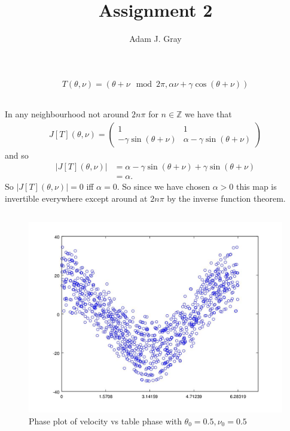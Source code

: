 \documentclass{unswmaths}
\begin{document}
\author{Adam J. Gray}
\title{Assignment 2}
\subject{Ergodic Theory}

\unswtitle

\section{}
\subsection{}
\begin{align*}
    T(\theta, \nu) = (\theta + \nu \mod 2\pi, \alpha\nu + \gamma \cos(\theta + \nu))
\end{align*}
\subsection{}
In any neighbourhood not around $ 2n\pi $ for $ n \in \mathbb{Z} $ we have that
\begin{align*}
    J[T](\theta, \nu) = \left( 
    \begin{array}{cc}
        1   & 1 \\
        -\gamma \sin(\theta + \nu) & \alpha - \gamma\sin(\theta + \nu)
    \end{array}
    \right)
\end{align*}
and so
\begin{align*}
|J[T](\theta, \nu)| &= \alpha - \gamma\sin(\theta + \nu) + \gamma\sin(\theta + \nu) \\
    &= \alpha.
\end{align*}
So $ |J[T](\theta, \nu)| = 0 $ iff $ \alpha = 0 $. So since we have chosen $ \alpha > 0 $ this map is invertible everywhere except around at $ 2n\pi $ by the inverse function theorem.
\subsection{}
\begin{figure}[h]
    \includegraphics[scale=0.5]{Question_3}
    \caption{Phase plot of velocity vs table phase with $ \theta_0 = 0.5, \nu_0 = 0.5 $}
\end{figure}
\end{document}

